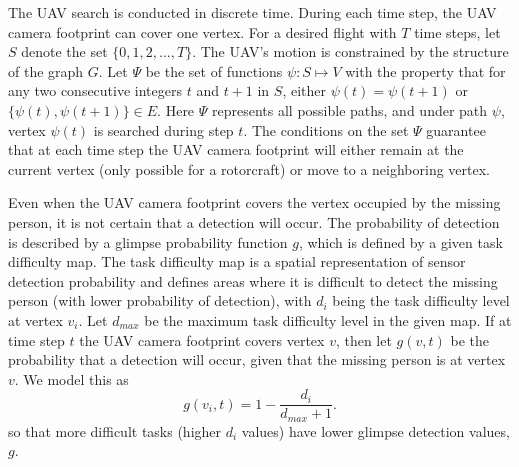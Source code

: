 The UAV search is conducted in discrete time. During each time step, the UAV camera footprint can cover one vertex. For a desired flight with $T$ time steps, let $S$ denote the set $\{0,1,2,...,T\}$. The UAV's motion is constrained by the structure of the graph $G$. Let $\Psi$ be the set of functions $\psi:S \mapsto V$ with the property that for any two consecutive integers $t$ and $t+1$ in $S$, either $\psi(t)=\psi(t+1)$ or $\{\psi(t),\psi(t+1)\}\in E$. Here $\Psi$ represents all possible paths, and under path $\psi$, vertex $\psi(t)$ is searched during step $t$. The conditions on the set $\Psi$ guarantee that at each time step the UAV camera footprint will either remain at the current vertex (only possible for a rotorcraft) or move to a neighboring vertex.

Even when the UAV camera footprint covers the vertex occupied by the missing person, it is not certain that a detection will occur. The probability of detection is described by a glimpse probability function $g$, which is defined by a given task difficulty map. The task difficulty map is a spatial representation of sensor detection probability and defines areas where it is difficult to detect the missing person (with lower probability of detection), with $d_i$ being the task difficulty level at vertex $v_i$. Let $d_{max}$ be the maximum task difficulty level in the given map. If at time step $t$ the UAV camera footprint covers vertex $v$, then let $g(v,t)$ be the probability that a detection will occur, given that the missing person is at vertex $v$. We model this as
\begin{equation}
g(v_i,t) = 1 - \frac{d_i}{d_{max}+1}.
\label{g}
\end{equation}
so that more difficult tasks (higher $d_i$ values) have lower glimpse detection values, $g$.

